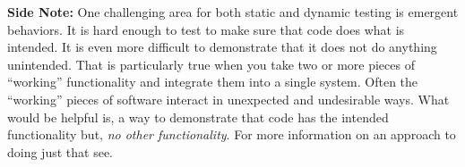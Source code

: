 \documentclass[12pt]{extarticle}
\begin{document}
\vspace{4mm}
\noindent	
\textbf{Side Note:} One challenging area for both static and dynamic testing is emergent behaviors.  It is hard enough to test to make sure that code does what is intended.  It is even more difficult to demonstrate that it does not do anything unintended.  That is particularly true when you take two or more pieces of ``working'' functionality and integrate them into a single system.  Often the ``working'' pieces of software interact in unexpected and undesirable ways. What would be helpful is, a way to demonstrate that code has the intended functionality but, \textit{no other functionality}.   For more information on an approach to doing just that see\cite{Daniel}.


\end{document}
